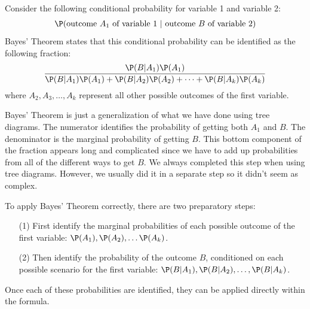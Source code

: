 \begin{termBox}{
Consider the following conditional probability for variable 1 and variable 2:\vspace{-1.5mm}
\begin{align*}
\P(\text{outcome $A_1$ of variable 1 } | \text{ outcome $B$ of variable 2})
\end{align*}
Bayes' Theorem states that this conditional probability can be identified as the following fraction:\vspace{-1.5mm}
\begin{align}
\frac{\P(B | A_1) \P(A_1)}
	{\P(B | A_1) \P(A_1) + \P(B | A_2) \P(A_2) + \cdots + \P(B | A_k) \P(A_k)}
	\label{equationOfBayesTheorem}
\end{align}
where $A_2, A_3, \dots, A_k$ represent all other possible outcomes of the first variable.}
\end{termBox}

Bayes' Theorem is just a generalization of what we have done using tree diagrams. The numerator identifies the probability of getting both $A_1$ and $B$. The denominator is the marginal probability of getting $B$. This bottom component of the fraction appears long and complicated since we have to add up probabilities from all of the different ways to get $B$. We always completed this step when using tree diagrams. However, we usually did it in a separate step so it didn't seem as complex.

To apply Bayes' Theorem correctly, there are two preparatory steps:
\begin{enumerate}
\setlength{\itemsep}{0mm}
\item[(1)] First identify the marginal probabilities of each possible outcome of the first variable: $\P(A_1), \P(A_2),\dots \P(A_k)$.
\item[(2)] Then identify the probability of the outcome $B$, conditioned on each possible scenario for the first variable: $\P(B | A_1), \P(B | A_2), \dots, \P(B | A_k)$.
\end{enumerate}
Once each of these probabilities are identified, they can be applied directly within the formula.





